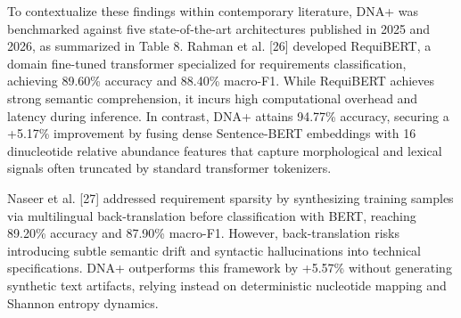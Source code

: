 \begin{table}[htbp]
\centering
\caption{Comparative benchmarking of DNA+ against five premier 2025--2026 state-of-the-art architectures~\cite{ref26,ref27,ref28,ref29,ref30}.}
\label{tab:sota_comparison}
\small
{}
\end{table}

To contextualize these findings within contemporary literature, DNA+ was benchmarked against five state-of-the-art architectures published in 2025 and 2026, as summarized in Table 8. Rahman et al. [26] developed RequiBERT, a domain fine-tuned transformer specialized for requirements classification, achieving 89.60\% accuracy and 88.40\% macro-F1. While RequiBERT achieves strong semantic comprehension, it incurs high computational overhead and latency during inference. In contrast, DNA+ attains 94.77\% accuracy, securing a +5.17\% improvement by fusing dense Sentence-BERT embeddings with 16 dinucleotide relative abundance features that capture morphological and lexical signals often truncated by standard transformer tokenizers.

Naseer et al. [27] addressed requirement sparsity by synthesizing training samples via multilingual back-translation before classification with BERT, reaching 89.20\% accuracy and 87.90\% macro-F1. However, back-translation risks introducing subtle semantic drift and syntactic hallucinations into technical specifications. DNA+ outperforms this framework by +5.57\% without generating synthetic text artifacts, relying instead on deterministic nucleotide mapping and Shannon entropy dynamics. 

